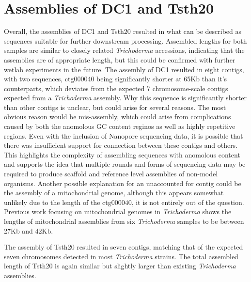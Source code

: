 \section{Assemblies of DC1 and Tsth20}
Overall, the assemblies of DC1 and Tsth20 resulted in what can be
described as sequences suitable for further downstream
processing. Assembled lengths for both samples are similar to closely
related \textit{Trichoderma} accessions, indicating that the
assemblies are of appropriate length, but this could be confirmed with
further wetlab experiments in the future. The assembly of DC1 resulted
in eight contigs, with two sequences, ctg000040 being significantly
shorter at 65Kb than it's counterparts, which deviates from the
expected 7 chromosome-scale contigs expected from a
\textit{Trichoderma} assembly\cite{Kubicek2019}. Why this sequence is
significantly shorter than other contigs is unclear, but could arise
for several reasons. The most obvious reason would be mis-assembly,
which could arise from complications caused by both the anomolous GC
content reginos as well as highly repetitive regions. Even with the
inclusion of Nanopore sequencing data, it is possible that there was
insufficient support for connection between these contigs and
others. This highlights the complexity of assembling sequences with
anomolous content and supports the idea that multiple rounds and forms
of sequencing data may be required to produce scaffold and reference
level assemblies of non-model organisms. Another possible explanation
for an unaccounted for contig could be the assembly of a mitochondrial
genome, although this appears somewhat unlikely due to the length of
the ctg000040, it is not entirely out of the question. Previous work
focusing on mitochondrial genomes in \textit{Trichoderma} shows the
lengths of mitochondrial assemblies from six \textit{Trichoderma}
samples to be between 27Kb and 42Kb.

The assembly of Tsth20 resulted in seven contigs, matching that of the
expected seven chromosomes detected in most \textit{Trichoderma}
strains. The total assembled length of Tsth20 is again similar but
slightly larger than existing \textit{Trichoderma} assemblies.
